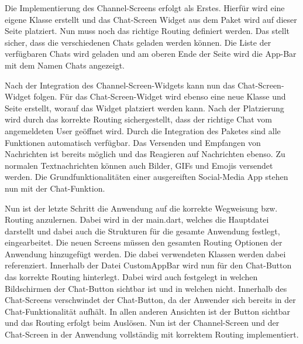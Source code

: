 \noindent
Die Implementierung des Channel-Screens erfolgt als Erstes. Hierfür wird eine eigene Klasse erstellt und das Chat-Screen Widget aus dem Paket wird auf dieser Seite platziert. Nun muss noch das richtige Routing definiert werden. Das stellt sicher, dass die verschiedenen Chats geladen werden können. Die Liste der verfügbaren Chats wird geladen und am oberen Ende der Seite wird die App-Bar mit dem Namen Chats angezeigt.

\noindent
Nach der Integration des Channel-Screen-Widgets kann nun das Chat-Screen-Widget folgen. Für das Chat-Screen-Widget wird ebenso eine neue Klasse und Seite erstellt, worauf das Widget platziert werden kann. Nach der Platzierung wird durch das korrekte Routing sichergestellt, dass der richtige Chat vom angemeldeten User geöffnet wird. Durch die Integration des Paketes sind alle Funktionen automatisch verfügbar. Das Versenden und Empfangen von Nachrichten ist bereits möglich und das Reagieren auf Nachrichten ebenso. Zu normalen Textnachrichten können auch Bilder, GIFs und Emojis versendet werden. Die Grundfunktionalitäten einer ausgereiften Social-Media App stehen nun mit der Chat-Funktion.

\noindent
Nun ist der letzte Schritt die Anwendung auf die korrekte Wegweisung bzw. Routing anzulernen. Dabei wird in der main.dart, welches die Hauptdatei darstellt und dabei auch die Strukturen für die gesamte Anwendung festlegt, eingearbeitet. Die neuen Screens müssen den gesamten Routing Optionen der Anwendung hinzugefügt werden. Die dabei verwendeten Klassen werden dabei referenziert. Innerhalb der Datei CustomAppBar wird nun für den Chat-Button das korrekte Routing hinterlegt. Dabei wird auch festgelegt in welchen Bildschirmen der Chat-Button sichtbar ist und in welchen nicht. Innerhalb des Chat-Screens verschwindet der Chat-Button, da der Anwender sich bereits in der Chat-Funktionalität aufhält. In allen anderen Ansichten ist der Button sichtbar und das Routing erfolgt beim Auslösen. Nun ist der Channel-Screen und der Chat-Screen in der Anwendung vollständig mit korrektem Routing implementiert.